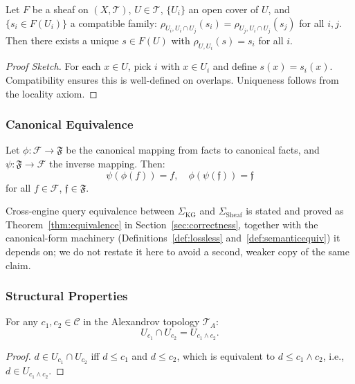 \begin{theorem}[Gluing]
\label{thm:gluing}
Let $F$ be a sheaf on $(X, \mathcal{T})$, $U \in \mathcal{T}$,
$\{U_i\}$ an open cover of $U$, and $\{s_i \in F(U_i)\}$ a compatible family:
$\rho_{U_i, U_i \cap U_j}(s_i) = \rho_{U_j, U_i \cap U_j}(s_j)$ for all $i,j$.
Then there exists a unique $s \in F(U)$ with $\rho_{U,U_i}(s) = s_i$ for all $i$.
\end{theorem}

\begin{proof}[Proof Sketch]
For each $x \in U$, pick $i$ with $x \in U_i$ and define $s(x) = s_i(x)$.
Compatibility ensures this is well-defined on overlaps.
Uniqueness follows from the locality axiom.
\end{proof}

\subsubsection{Canonical Equivalence}

\begin{theorem}
\label{thm:canonical}
Let $\phi: \mathcal{F} \to \mathfrak{F}$ be the canonical mapping from facts to canonical facts,
and $\psi: \mathfrak{F} \to \mathcal{F}$ the inverse mapping. Then:
\[
\psi(\phi(f)) = f,\quad \phi(\psi(\mathfrak{f})) = \mathfrak{f}
\]
for all $f \in \mathcal{F}$, $\mathfrak{f} \in \mathfrak{F}$.
\end{theorem}

Cross-engine query equivalence between $\Sigma_{\mathrm{KG}}$ and
$\Sigma_{\mathrm{Sheaf}}$ is stated and proved as
Theorem~\ref{thm:equivalence} in Section~\ref{sec:correctness}, together
with the canonical-form machinery (Definitions~\ref{def:lossless}
and~\ref{def:semanticequiv}) it depends on; we do not restate it here to
avoid a second, weaker copy of the same claim.

\subsubsection{Structural Properties}

\begin{theorem}
\label{thm:meet}
For any $c_1, c_2 \in \mathcal{C}$ in the Alexandrov topology $\mathcal{T}_A$:
\[
U_{c_1} \cap U_{c_2} = U_{c_1 \wedge c_2}.
\]
\end{theorem}

\begin{proof}
$d \in U_{c_1} \cap U_{c_2}$ iff $d \leq c_1$ and $d \leq c_2$, which is
equivalent to $d \leq c_1 \wedge c_2$, i.e., $d \in U_{c_1 \wedge c_2}$.
\end{proof}

